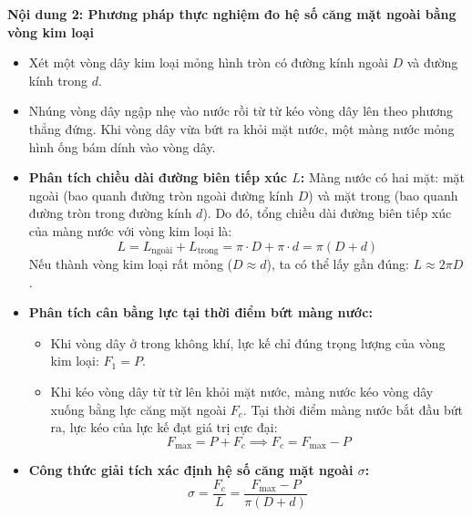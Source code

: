 \documentclass[12pt, a4paper]{article}
\begin{document}
\noindent \textbf{Nội dung 2: Phương pháp thực nghiệm đo hệ số căng mặt ngoài bằng vòng kim loại}
\begin{itemize}
    \item Xét một vòng dây kim loại mỏng hình tròn có đường kính ngoài $D$ và đường kính trong $d$.
    \item Nhúng vòng dây ngập nhẹ vào nước rồi từ từ kéo vòng dây lên theo phương thẳng đứng. Khi vòng dây vừa bứt ra khỏi mặt nước, một màng nước mỏng hình ống bám dính vào vòng dây.
    \item \textbf{Phân tích chiều dài đường biên tiếp xúc $L$:}
    Màng nước có hai mặt: mặt ngoài (bao quanh đường tròn ngoài đường kính $D$) và mặt trong (bao quanh đường tròn trong đường kính $d$). Do đó, tổng chiều dài đường biên tiếp xúc của màng nước với vòng kim loại là:
    \begin{equation}
        L = L_{\text{ngoài}} + L_{\text{trong}} = \pi \cdot D + \pi \cdot d = \pi(D + d)
    \end{equation}
    Nếu thành vòng kim loại rất mỏng ($D \approx d$), ta có thể lấy gần đúng: $L \approx 2\pi D$.
    \item \textbf{Phân tích cân bằng lực tại thời điểm bứt màng nước:}
    \begin{itemize}
        \item Khi vòng dây ở trong không khí, lực kế chỉ đúng trọng lượng của vòng kim loại: $F_1 = P$.
        \item Khi kéo vòng dây từ từ lên khỏi mặt nước, màng nước kéo vòng dây xuống bằng lực căng mặt ngoài $F_c$. Tại thời điểm màng nước bắt đầu bứt ra, lực kéo của lực kế đạt giá trị cực đại:
        $$F_{\text{max}} = P + F_c \implies F_c = F_{\text{max}} - P$$
    \end{itemize}
    \item \textbf{Công thức giải tích xác định hệ số căng mặt ngoài $\sigma$:}
    \begin{equation}
        \sigma = \dfrac{F_c}{L} = \dfrac{F_{\text{max}} - P}{\pi(D + d)}
    \end{equation}
\end{itemize}
\end{document}
